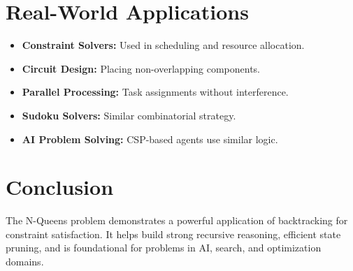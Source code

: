 \documentclass[14pt]{extarticle}
\begin{document}
\section{Real-World Applications}
\begin{itemize}
    \item \textbf{Constraint Solvers:} Used in scheduling and resource allocation.
    \item \textbf{Circuit Design:} Placing non-overlapping components.
    \item \textbf{Parallel Processing:} Task assignments without interference.
    \item \textbf{Sudoku Solvers:} Similar combinatorial strategy.
    \item \textbf{AI Problem Solving:} CSP-based agents use similar logic.
\end{itemize}

\section{Conclusion}
The N-Queens problem demonstrates a powerful application of backtracking for constraint satisfaction. It helps build strong recursive reasoning, efficient state pruning, and is foundational for problems in AI, search, and optimization domains.
\end{document}
